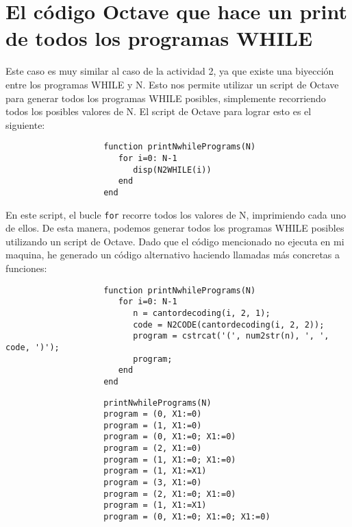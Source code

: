 \documentclass{article}
\begin{document}
\newpage
\section{El código Octave que hace un print de todos los programas WHILE}
Este caso es muy similar al caso de la actividad 2, ya que existe una biyección entre los programas WHILE y N. Esto nos permite utilizar un script de Octave para generar todos los programas WHILE posibles, simplemente recorriendo todos los posibles valores de N. El script de Octave para lograr esto es el siguiente:




\begin{verbatim}
                    function printNwhilePrograms(N)
                       for i=0: N-1
                          disp(N2WHILE(i))
                       end
                    end
\end{verbatim}


En este script, el bucle \verb|for|  recorre todos los valores de N, imprimiendo cada uno de ellos. De esta manera, podemos generar todos los programas WHILE posibles utilizando un script de Octave. Dado que el código mencionado no ejecuta en mi maquina, he generado un código alternativo haciendo llamadas más concretas a funciones:



\begin{verbatim}
                    function printNwhilePrograms(N)
                       for i=0: N-1
                          n = cantordecoding(i, 2, 1);
                          code = N2CODE(cantordecoding(i, 2, 2));
                          program = cstrcat('(', num2str(n), ', ', code, ')');
                          program;
                       end
                    end
\end{verbatim}

\vspace{1cm}

\begin{verbatim}
                    printNwhilePrograms(N)
                    program = (0, X1:=0)
                    program = (1, X1:=0)
                    program = (0, X1:=0; X1:=0)
                    program = (2, X1:=0)
                    program = (1, X1:=0; X1:=0)
                    program = (1, X1:=X1)
                    program = (3, X1:=0)
                    program = (2, X1:=0; X1:=0)
                    program = (1, X1:=X1)
                    program = (0, X1:=0; X1:=0; X1:=0)
                    
\end{verbatim}
\end{document}
